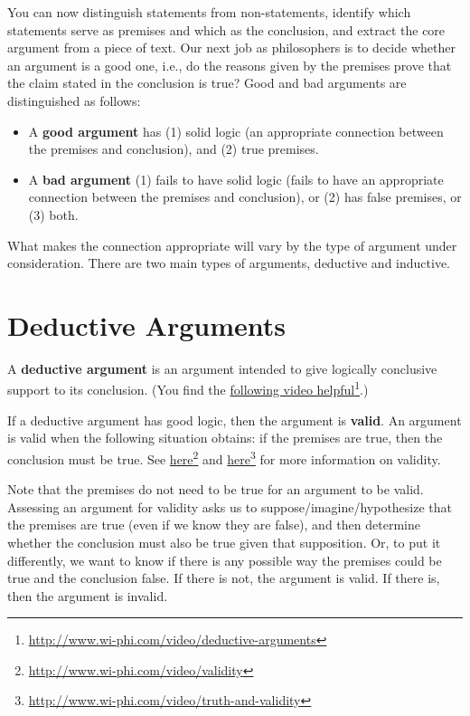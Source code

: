 \documentclass[report,oneside]{memoir}
\begin{document}
You can now distinguish statements from non-statements, identify which statements serve as premises and which as the conclusion, and extract the core argument from a piece of text. Our next job as philosophers is to decide whether an argument is a good one, i.e., do the reasons given by the premises prove that the claim stated in the conclusion is true? Good and bad arguments are distinguished as follows:
\begin{itemize}
\item A \textbf{good argument} has (1) solid logic (an appropriate connection between the premises and conclusion), and (2) true premises. 

\item A \textbf{bad argument} (1) fails to have solid logic (fails to have an appropriate connection between the premises and conclusion), or (2) has false premises, or (3) both. 
\end{itemize}
What makes the connection appropriate will vary by the type of argument under consideration. There are two main types of arguments, deductive and inductive. 

\section{Deductive Arguments}
\label{deductivearguments}

A \textbf{deductive argument} is an argument intended to give logically conclusive support to its conclusion. (You find the \href{http://www.wi-phi.com/video/deductive-arguments}{following video helpful}\footnote{\href{http://www.wi-phi.com/video/deductive-arguments}{http:/\slash www.wi-phi.com\slash video\slash deductive-arguments}}.)

If a deductive argument has good logic, then the argument is \textbf{valid}. An argument is valid when the following situation obtains: if the premises are true, then the conclusion must be true. See \href{http://www.wi-phi.com/video/validity}{here}\footnote{\href{http://www.wi-phi.com/video/validity}{http:/\slash www.wi-phi.com\slash video\slash validity}} and \href{http://www.wi-phi.com/video/truth-and-validity}{here}\footnote{\href{http://www.wi-phi.com/video/truth-and-validity}{http:/\slash www.wi-phi.com\slash video\slash truth-and-validity}} for more information on validity. 

Note that the premises do not need to be true for an argument to be valid. Assessing an argument for validity asks us to suppose\slash imagine\slash hypothesize that the premises are true (even if we know they are false), and then determine whether the conclusion must also be true given that supposition. Or, to put it differently, we want to know if there is any possible way the premises could be true and the conclusion false. If there is not, the argument is valid. If there is, then the argument is invalid. 
\end{document}
